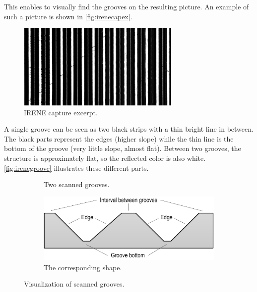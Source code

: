This enables to visually find the grooves on the resulting picture. An example of such a picture is shown in \autoref{fig:irenecapex}.

\begin{figure}[!ht]
\centering
\includegraphics[width=0.7\textwidth]{images/irene-capture-ex}
\caption{IRENE capture excerpt.}
\label{fig:irenecapex}
\end{figure}

A single groove can be seen as two black strips with a thin bright line in between. The black parts represent the edges (higher slope) while the thin line is the bottom of the groove (very little slope, almost flat). Between two grooves, the structure is approximately flat, so the reflected color is also white. \autoref{fig:irenegroove} illustrates these different parts.

\begin{figure}[!ht]
\centering
    \begin{subfigure}[t]{0.29\textwidth}
    \centering
    \caption{Two scanned grooves.}
    \label{fig:irenegrimg}
    \end{subfigure}
    \begin{subfigure}[t]{0.7\textwidth}
    \centering
    \includegraphics[width=9.5cm]{images/irene-grooves-schema}
    \caption{The corresponding shape.}
    \label{fig:irenegrschema}
    \end{subfigure}
    \caption{Visualization of scanned grooves.}
    \label{fig:irenegroove}
\end{figure}

